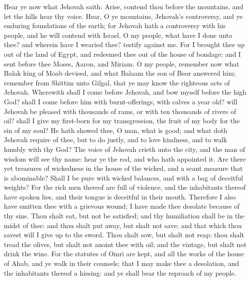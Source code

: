 Hear ye now what Jehovah saith: Arise, contend thou before the mountains, and let the hills hear thy voice. Hear, O ye mountains, Jehovah’s controversy, and ye enduring foundations of the earth; for Jehovah hath a controversy with his people, and he will contend with Israel. O my people, what have I done unto thee? and wherein have I wearied thee? testify against me. For I brought thee up out of the land of Egypt, and redeemed thee out of the house of bondage; and I sent before thee Moses, Aaron, and Miriam. O my people, remember now what Balak king of Moab devised, and what Balaam the son of Beor answered him; remember from Shittim unto Gilgal, that ye may know the righteous acts of Jehovah.  Wherewith shall I come before Jehovah, and bow myself before the high God? shall I come before him with burnt-offerings, with calves a year old? will Jehovah be pleased with thousands of rams, or with ten thousands of rivers of oil? shall I give my first-born for my transgression, the fruit of my body for the sin of my soul? He hath showed thee, O man, what is good; and what doth Jehovah require of thee, but to do justly, and to love kindness, and to walk humbly with thy God?  The voice of Jehovah crieth unto the city, and the man of wisdom will see thy name: hear ye the rod, and who hath appointed it. Are there yet treasures of wickedness in the house of the wicked, and a scant measure that is abominable? Shall I be pure with wicked balances, and with a bag of deceitful weights? For the rich men thereof are full of violence, and the inhabitants thereof have spoken lies, and their tongue is deceitful in their mouth. Therefore I also have smitten thee with a grievous wound; I have made thee desolate because of thy sins. Thou shalt eat, but not be satisfied; and thy humiliation shall be in the midst of thee: and thou shalt put away, but shalt not save; and that which thou savest will I give up to the sword. Thou shalt sow, but shalt not reap; thou shalt tread the olives, but shalt not anoint thee with oil; and the vintage, but shalt not drink the wine. For the statutes of Omri are kept, and all the works of the house of Ahab, and ye walk in their counsels; that I may make thee a desolation, and the inhabitants thereof a hissing: and ye shall bear the reproach of my people. 

